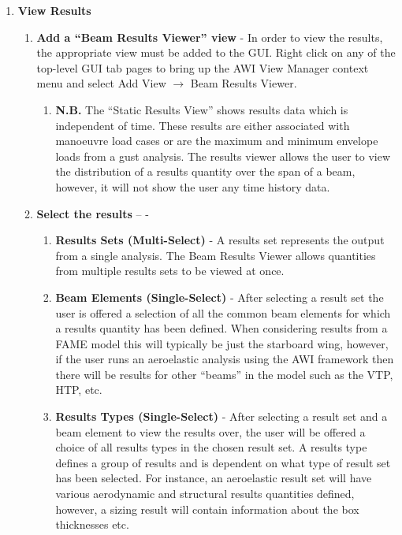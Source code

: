 \begin{enumerate}
\begin{enumerate}
\begin{enumerate}
\begin{itemize}
\begin{enumerate}
				\end{enumerate}
			\end{itemize}
		\end{enumerate}
	\end{enumerate}
	\item \textbf{View Results}
	\begin{enumerate}
		\item \textbf{Add a ``Beam Results Viewer'' view} - In order to view the results, the appropriate view must be added to the GUI. Right click on any of the top-level GUI tab pages to bring up the AWI View Manager context menu and select Add View $\rightarrow$ Beam Results Viewer.
		\begin{enumerate}
			\item \textbf{N.B.} The ``Static Results View'' shows results data which is independent of time. These results are either associated with manoeuvre load cases or are the maximum and minimum envelope loads from a gust analysis. The results viewer allows the user to view the distribution of a results quantity over the span of a beam, however, it will not show the user any time history data.
		\end{enumerate}	
		\item \textbf{Select the results} –  - 
		\begin{enumerate}
			\item \textbf{Results Sets (Multi-Select)} - A results set represents the output from a single analysis. The Beam Results Viewer allows quantities from multiple results sets to be viewed at once.
			\item \textbf{Beam Elements (Single-Select)} - After selecting a result set the user is offered a selection of all the common beam elements for which a results quantity has been defined. When considering results from a FAME model this will typically be just the starboard wing, however, if the user runs an aeroelastic analysis using the AWI framework then there will be results for other ``beams'' in the model such as the VTP, HTP, etc.
			\item \textbf{Results Types (Single-Select)}  - After selecting a result set and a beam element to view the results over, the user will be offered a choice of all results types in the chosen result set. A results type defines a group of results and is dependent on what type of result set has been selected. For instance, an aeroelastic result set will have various aerodynamic and structural results quantities defined, however, a sizing result will contain information about the box thicknesses etc. 

\end{enumerate}
\end{enumerate}
\end{enumerate}

